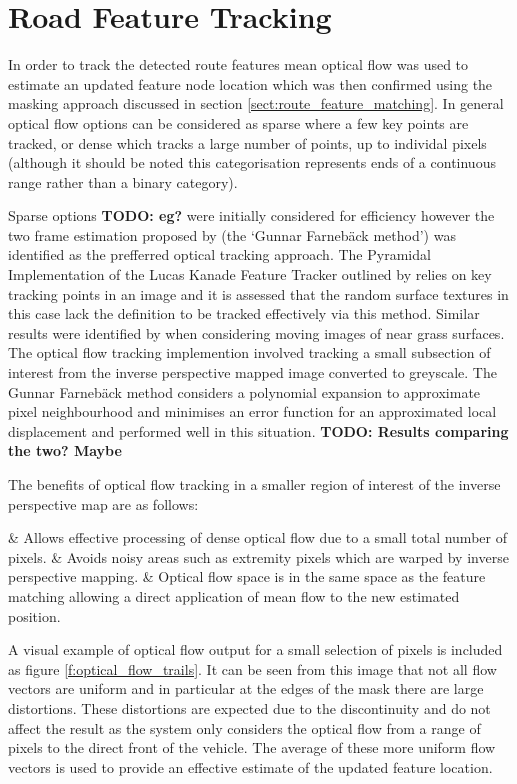\documentclass[]{aiaa-tc}%
\begin{document}
\section{Road Feature Tracking}\label{s:roadFeatureTracking}

In order to track the detected route features mean optical flow was used to estimate an updated feature node location which was then confirmed using the masking approach discussed in section \ref{sect:route_feature_matching}. In general optical flow options can be considered as sparse where a few key points are tracked, or dense which tracks a large number of points, up to individal pixels (although it should be noted this categorisation represents ends of a continuous range rather than a binary category). 

Sparse options \textbf{TODO: eg?} were initially considered for efficiency however the two frame estimation proposed by \citet{opticalFlowSolution} (the `Gunnar Farneb{\"a}ck method') was identified as the prefferred optical tracking approach. The Pyramidal Implementation of the Lucas Kanade Feature Tracker outlined by \citet{opticalFlowLKPyramidal} relies on key tracking points in an image and it is assessed that the random surface textures in this case lack the definition to be tracked effectively via this method. Similar results were identified by \citet{opticalFlowLKvsDenseUAV} when considering moving images of near grass surfaces. The optical flow tracking implemention involved tracking a small subsection of interest from the inverse perspective mapped image converted to greyscale. The Gunnar Farneb{\"a}ck method considers a polynomial expansion to approximate pixel neighbourhood and minimises an error function for an approximated local displacement and performed well in this situation. \textbf{TODO: Results comparing the two? Maybe }

The benefits of optical flow tracking in a smaller region of interest of the inverse perspective map are as follows:
\begin{easylist}
	& Allows effective processing of dense optical flow due to a small total number of pixels.
	& Avoids noisy areas such as extremity pixels which are warped by inverse perspective mapping.
	& Optical flow space is in the same space as the feature matching allowing a direct application of mean flow to the new estimated position.
\end{easylist}

A visual example of optical flow output for a small selection of pixels is included as figure \ref{f:optical_flow_trails}. It can be seen from this image that not all flow vectors are uniform and in particular at the edges of the mask there are large distortions. These distortions are expected due to the discontinuity and do not affect the result as the system only considers the optical flow from a range of pixels to the direct front of the vehicle. The average of these more uniform flow vectors is used to provide an effective estimate of the updated feature location.
\end{document}
